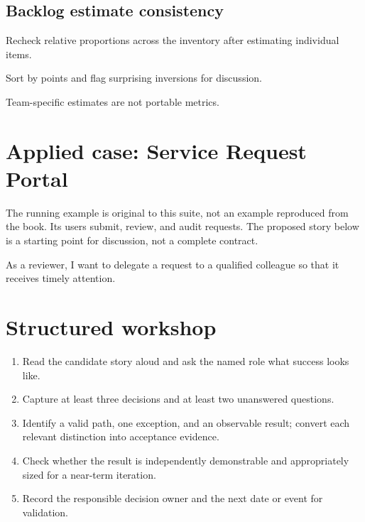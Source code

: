 \documentclass[11pt,letterpaper]{article}
\begin{document}
\subsection{Backlog estimate consistency}
Recheck relative proportions across the inventory after estimating individual items.

\begin{tcolorbox}[colback=tealback,colframe=navy,title={Engineering translation},breakable]
Sort by points and flag surprising inversions for discussion.

\end{tcolorbox}
\begin{tcolorbox}[colback=amberback,colframe=navy,title={Failure mode to watch},breakable]
Team-specific estimates are not portable metrics.

\end{tcolorbox}
\section{Applied case: Service Request Portal}
The running example is original to this suite, not an example reproduced from the book. Its users submit, review, and audit requests. The proposed story below is a starting point for discussion, not a complete contract.

\begin{tcolorbox}[colback=blueback,colframe=navy,title={Candidate story},breakable]
As a reviewer, I want to delegate a request to a qualified colleague so that it receives timely attention.

\end{tcolorbox}
\section{Structured workshop}
\begin{enumerate}[leftmargin=*,itemsep=3pt]
\item Read the candidate story aloud and ask the named role what success looks like.
\item Capture at least three decisions and at least two unanswered questions.
\item Identify a valid path, one exception, and an observable result; convert each relevant distinction into acceptance evidence.
\item Check whether the result is independently demonstrable and appropriately sized for a near-term iteration.
\item Record the responsible decision owner and the next date or event for validation.
\end{enumerate}
\end{document}
